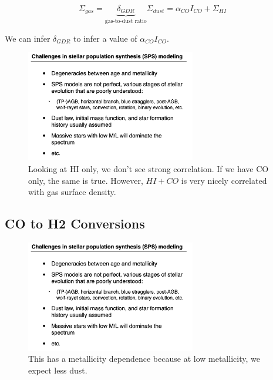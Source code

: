 \documentclass{article}
\begin{document}
\begin{equation}
    \Sigma_{gas} = \underbrace{\delta_{GDR}}_\text{gas-to-dust ratio} \Sigma_{dust} = \alpha_{CO} I_{CO} + \Sigma_{HI}
\end{equation}

We can infer $\delta_{GDR}$ to infer a value of $\alpha_{CO} I_{CO}$.

\begin{figure}
    \centering
    \includegraphics[width=0.66\textwidth]{figs/Screen Shot 2021-09-24 at 9.35.27 AM.png}
    \caption{Looking at HI only, we don't see strong correlation. If we have CO only, the same is true. However, $HI+CO$ is very nicely correlated with gas surface density. }
    \label{fig:coHI_rel}
\end{figure}

\subsection{CO to H2 Conversions}

\begin{figure}
    \centering
    \includegraphics[width=0.66\textwidth]{figs/Screen Shot 2021-09-24 at 9.35.27 AM.png}
    \caption{This has a metallicity dependence because at low metallicity, we expect less dust. }
    \label{fig:alpha_co_z_dependence}
\end{figure}
\end{document}
